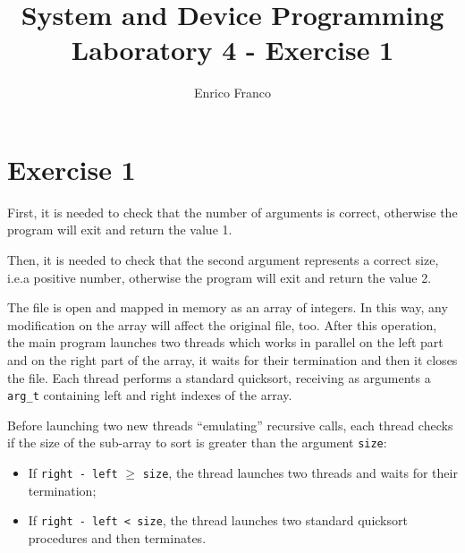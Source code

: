 \documentclass{report}
\author{Enrico Franco}
\title{System and Device Programming \\
	Laboratory 4 - Exercise 1}
\begin{document}
\section*{Exercise 1}
First, it is needed to check that the number of arguments is correct, otherwise the program will exit and return the value 1.

Then, it is needed to check that the second argument represents a correct size, i.e.\@ a positive number, otherwise the program will exit and return the value 2.

The file is open and mapped in memory as an array of integers. In this way, any modification on the array will affect the original file, too. After this operation, the main program launches two threads which works in parallel on the left part and on the right part of the array, it waits for their termination and then it closes the file. Each thread performs a standard quicksort, receiving as arguments a \texttt{arg\_t} containing left and right indexes of the array.

Before launching two new threads ``emulating'' recursive calls, each thread checks if the size of the sub-array to sort is greater than the argument \texttt{size}:
\begin{itemize}
\item If \texttt{right - left} $\ge$ \texttt{size}, the thread launches two threads and waits for their termination;
\item If \texttt{right - left < size}, the thread launches two standard quicksort procedures and then terminates.
\end{itemize}
\end{document}

